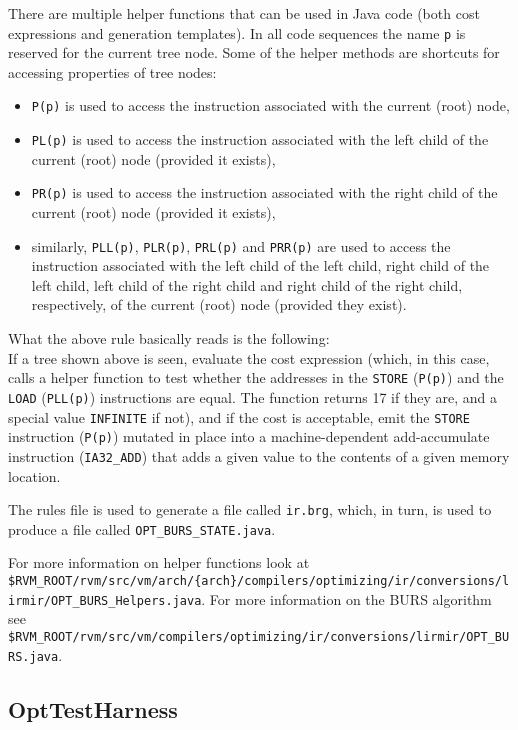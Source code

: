 There are multiple helper functions that can be used in Java code (both cost
expressions and generation templates).  In all code sequences the name
{\tt p} is reserved for the current tree node.  Some of the helper methods
are shortcuts for accessing properties of tree nodes:
\begin{itemize}
\item {\tt P(p)} is used to access the instruction associated with the
current (root) node,
\item {\tt PL(p)} is used to access the instruction associated with the left
child of the current (root) node (provided it exists),
\item {\tt PR(p)} is used to access the instruction associated with the
right child of the current (root) node (provided it exists),
\item similarly, {\tt PLL(p)}, {\tt PLR(p)}, {\tt PRL(p)} and {\tt PRR(p)}
are used to access the instruction associated with the
left child of the left child, right child of the left child, left child of
the right child and right child of the right child, respectively, of the
current (root) node (provided they exist).
\end{itemize}

What the above rule basically reads is the following:\\
If a tree shown above is seen, evaluate the cost expression (which, in this
case, calls a helper function to test whether the addresses in the
{\tt STORE} ({\tt P(p)}) and the {\tt LOAD} ({\tt PLL(p)}) instructions are
equal.  The function returns 17 if they are, and a special value
{\tt INFINITE} if not), and if the cost is acceptable, emit the {\tt STORE}
instruction ({\tt P(p)}) mutated in place into a machine-dependent
add-accumulate instruction ({\tt IA32\_ADD}) that adds a given value to the
contents of a given memory location.

The rules file is used to generate a file called {\tt ir.brg}, which, in
turn, is used to produce a file called {\tt OPT\_BURS\_STATE.java}.

For more information on helper functions look at
{\tt \$RVM\_ROOT/rvm/src/\-vm/\-arch/\-\{arch\}/com\-pi\-l\-ers/op\-ti\-mi\-z\-ing/ir/\-con\-ver\-sions/\-lir\-mir/OPT\_BURS\_Helpers.java}.
For more information on the BURS algorithm see
{\tt \$RVM\_\-ROOT/\-rvm/\-src/\-vm/\-com\-pi\-l\-ers/\-op\-ti\-m\-i\-zing/\-ir/\-con\-ver\-sions/\-lir\-mir/OPT\_\-BURS.java}.

\subsection{OptTestHarness}\label{opttestharness}

